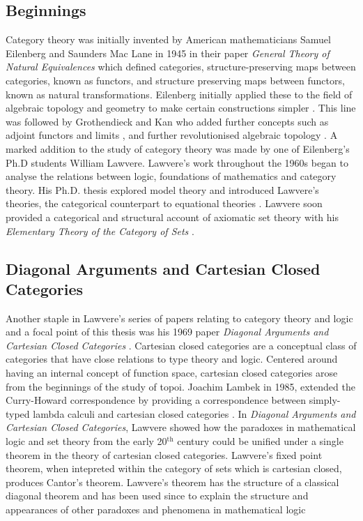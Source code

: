 \subsection{Beginnings}
Category theory was initially invented by American mathematicians Samuel
Eilenberg and Saunders Mac Lane in 1945 in their paper \textit{General Theory of
Natural Equivalences} \cite{eilenberg1945general} which defined categories, structure-preserving maps
between categories, known as functors, and structure preserving maps between
functors, known as natural transformations. Eilenberg initially applied these to
the field of algebraic topology and geometry to make certain constructions
simpler \cite{eilenberg1945axiomatic}.  This line was followed by Grothendieck
and Kan who added further concepts such as adjoint functors  and limits
\cite{kan1958adjoint}, and further revolutionised algebraic topology
\cite{grothendieck1957quelques}. A marked addition to the study of category
theory was made by one of Eilenberg's Ph.D students William Lawvere. Lawvere's
work throughout the 1960s began to analyse the relations between logic,
foundations of mathematics and category theory. His Ph.D. thesis explored model
theory and introduced Lawvere's theories, the categorical counterpart to
equational theories \cite{lawvere1963functorial}. Lawvere soon provided a
categorical and structural account of axiomatic set theory with his
\textit{Elementary Theory of the Category of Sets} \cite{lawvere1964elementary}.

\subsection{Diagonal Arguments and Cartesian Closed Categories} Another staple
in Lawvere's series of papers relating to category theory and logic and a focal
point of this thesis was his 1969 paper \textit{Diagonal Arguments and Cartesian
Closed Categories} \cite{lawvere1969diagonal}. Cartesian closed categories are a
conceptual class of categories that have close relations to type theory and
logic. Centered around having an internal concept of function space, cartesian
closed categories arose from the beginnings of the study of topoi.  Joachim
Lambek in 1985, extended the Curry-Howard correspondence by providing a
correspondence between simply-typed lambda calculi and cartesian closed
categories \cite{lambek1985cartesian}. In \textit{Diagonal Arguments and
Cartesian Closed Categories}, Lawvere showed how the paradoxes in mathematical
logic and set theory from the early 20$^{\textrm{th}}$ century could be unified
under a single theorem in the theory of cartesian closed categories. Lawvere's
fixed point theorem, when intepreted within the category of sets which is
cartesian closed, produces Cantor's theorem. Lawvere's theorem has the structure
of a classical diagonal theorem and has been used since to explain the structure
and appearances of other paradoxes and phenomena in mathematical logic


